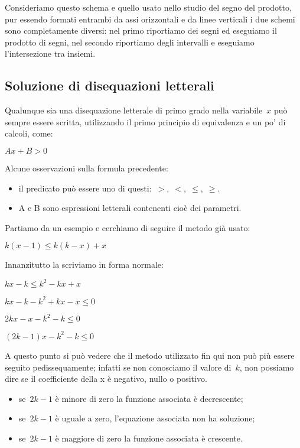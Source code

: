 \osservazione Consideriamo questo schema e quello usato nello studio del 
segno del prodotto, pur essendo formati entrambi da assi orizzontali e 
da linee verticali i due schemi sono completamente diversi: 
nel primo riportiamo dei segni ed eseguiamo il prodotto di segni, 
nel secondo riportiamo degli intervalli e eseguiamo l'intersezione tra 
insiemi. 

\subsection{Soluzione di disequazioni letterali}
\label{sec:dis_tetterali}

Qualunque sia una disequazione letterale di primo grado nella variabile~$x$ 
può sempre essere scritta, utilizzando il primo principio di equivalenza e un 
po' di calcoli, come:

$A x + B > 0$

Alcune osservazioni sulla formula precedente:

\begin{itemize} [noitemsep]
 \item il predicato può essere uno di questi:~$>, \; <, \; \le, \; \ge$.
 \item A e B sono espressioni letterali contenenti cioè dei parametri.
\end{itemize}

Partiamo da un  esempio e cerchiamo di seguire il metodo già usato:

$k \left( x -1 \right )\le k \left ( k - x \right ) + x$

Innanzitutto la scriviamo in forma normale:

$k x - k \le k^2 - k x + x $

$k x - k - k^2 + k x - x \le 0 $

$2 k x - x - k^2 - k \le 0 $

$\left (2 k - 1 \right ) x - k^2 - k \le 0$

A questo punto si può vedere che il metodo utilizzato fin qui non può più 
essere seguito pedissequamente; infatti se non conosciamo il valore di~$k$,
non possiamo dire se il coefficiente della x è negativo, nullo o positivo.

\begin{itemize} [noitemsep]
 \item se~$2 k - 1$ è minore di zero la funzione associata è decrescente;
 \item se~$2 k - 1$ è uguale a zero, l'equazione associata non ha soluzione;
 \item se~$2 k - 1$ è maggiore di zero la funzione associata è crescente.
\end{itemize}

